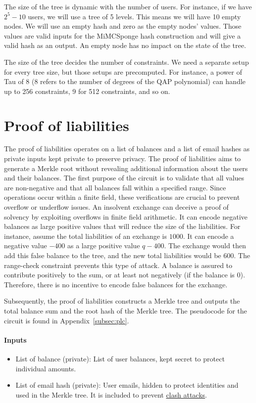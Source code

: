 The size of the tree is dynamic with the number of users. For instance, if we have $2^5 - 10$ users, we will use a tree of 5 levels. This means we will
have 10 empty nodes. We will use an empty hash and zero as the empty nodes' values. Those values are valid inputs for the MiMCSponge hash construction
and will give a valid hash as an output. An empty node has no impact on the state of the tree.

The size of the tree decides the number of constraints. We need a separate setup for every tree size, but those setups are precomputed. 
For instance, a power of Tau of 8 (8 refers to the number of degrees of the QAP polynomial) can handle up to 256 constraints, 9 for 512 constraints, and so on.


\section{Proof of liabilities}
\label{subsec:pl}
The proof of liabilities operates on a list of balances and a list of email hashes as private inputs kept private to preserve privacy. 
The proof of liabilities aims to generate a Merkle root without revealing additional information about the users and their balances.
The first purpose of the circuit is to validate that all values are non-negative and that all balances fall within a specified range.
Since operations occur within a finite field, these verifications are crucial to prevent overflow or underflow issues.
An insolvent exchange can deceive a proof of solvency by exploiting overflows in finite field arithmetic. 
It can encode negative balances as large positive values that will reduce the size of the liabilities. 
For instance, assume the total liabilities of an exchange is $1000$. It can encode a negative value $-400$ as a large positive value $q - 400$. 
The exchange would then add this false balance to the tree, and the new total liabilities would be $600$. 
The range-check constraint prevents this type of attack. A balance is assured to contribute positively to the sum, or at least not negatively (if the balance is 0). 
Therefore, there is no incentive to encode false balances for the exchange.

Subsequently, the proof of liabilities constructs a Merkle tree and outputs the total balance sum and the root hash of the Merkle tree.
The pseudocode for the circuit is found in Appendix~\ref{subsec:plc}.


\paragraph{Inputs}
\begin{itemize}
   \item List of balance (private): List of user balances, kept secret to protect individual amounts.
   \item List of email hash (private): User emails, hidden to protect identities and used in the Merkle tree. It is included to prevent \hyperref[subsec:ca]{clash attacks}.
   \end{itemize}


